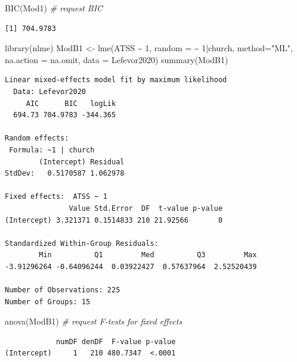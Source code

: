 \documentclass[
  11pt,
]{book}
\newenvironment{Shaded}{\begin{snugshade}}{\end{snugshade}}
\newcommand{\AttributeTok}[1]{\textcolor[rgb]{0.77,0.63,0.00}{#1}}
\newcommand{\CommentTok}[1]{\textcolor[rgb]{0.56,0.35,0.01}{\textit{#1}}}
\newcommand{\DecValTok}[1]{\textcolor[rgb]{0.00,0.00,0.81}{#1}}
\newcommand{\FunctionTok}[1]{\textcolor[rgb]{0.00,0.00,0.00}{#1}}
\newcommand{\NormalTok}[1]{#1}
\newcommand{\OtherTok}[1]{\textcolor[rgb]{0.56,0.35,0.01}{#1}}
\newcommand{\SpecialCharTok}[1]{\textcolor[rgb]{0.00,0.00,0.00}{#1}}
\newcommand{\StringTok}[1]{\textcolor[rgb]{0.31,0.60,0.02}{#1}}
\begin{document}
\begin{Shaded}
\begin{Highlighting}[]
\FunctionTok{BIC}\NormalTok{(Mod1) }\CommentTok{\# request BIC}
\end{Highlighting}
\end{Shaded}

\begin{verbatim}
[1] 704.9783
\end{verbatim}

\begin{Shaded}
\begin{Highlighting}[]
\FunctionTok{library}\NormalTok{(nlme)}
\NormalTok{ModB1 }\OtherTok{\textless{}{-}} \FunctionTok{lme}\NormalTok{(ATSS }\SpecialCharTok{\textasciitilde{}} \DecValTok{1}\NormalTok{, }\AttributeTok{random =} \SpecialCharTok{\textasciitilde{}} \DecValTok{1}\SpecialCharTok{|}\NormalTok{church, }\AttributeTok{method=}\StringTok{"ML"}\NormalTok{, }\AttributeTok{na.action =}\NormalTok{ na.omit, }\AttributeTok{data =}\NormalTok{ Lefevor2020)}
\FunctionTok{summary}\NormalTok{(ModB1)}
\end{Highlighting}
\end{Shaded}

\begin{verbatim}
Linear mixed-effects model fit by maximum likelihood
  Data: Lefevor2020 
     AIC      BIC   logLik
  694.73 704.9783 -344.365

Random effects:
 Formula: ~1 | church
        (Intercept) Residual
StdDev:   0.5170587 1.062978

Fixed effects:  ATSS ~ 1 
               Value Std.Error  DF  t-value p-value
(Intercept) 3.321371 0.1514833 210 21.92566       0

Standardized Within-Group Residuals:
        Min          Q1         Med          Q3         Max 
-3.91296264 -0.64096244  0.03922427  0.57637964  2.52520439 

Number of Observations: 225
Number of Groups: 15 
\end{verbatim}

\begin{Shaded}
\begin{Highlighting}[]
\FunctionTok{anova}\NormalTok{(ModB1) }\CommentTok{\# request F{-}tests for fixed effects}
\end{Highlighting}
\end{Shaded}

\begin{verbatim}
            numDF denDF  F-value p-value
(Intercept)     1   210 480.7347  <.0001
\end{verbatim}
\end{document}
